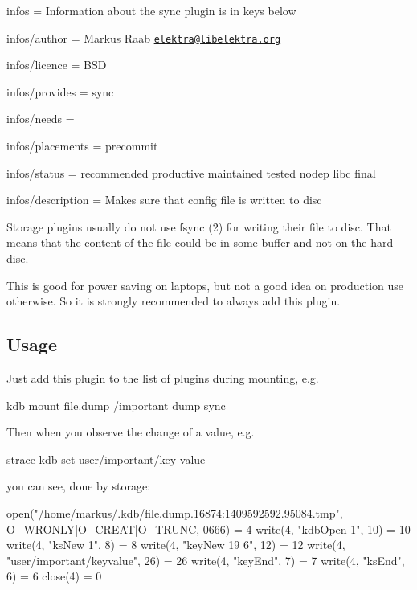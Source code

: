 
\begin{DoxyItemize}
\item infos = Information about the sync plugin is in keys below
\item infos/author = Markus Raab \href{mailto:elektra@libelektra.org}{\tt elektra@libelektra.\+org}
\item infos/licence = B\+SD
\item infos/provides = sync
\item infos/needs =
\item infos/placements = precommit
\item infos/status = recommended productive maintained tested nodep libc final
\item infos/description = Makes sure that config file is written to disc
\end{DoxyItemize}

Storage plugins usually do not use fsync (2) for writing their file to disc. That means that the content of the file could be in some buffer and not on the hard disc.

This is good for power saving on laptops, but not a good idea on production use otherwise. So it is strongly recommended to always add this plugin.

\subsection*{Usage}

Just add this plugin to the list of plugins during mounting, e.\+g. \begin{DoxyVerb}kdb mount file.dump /important dump sync
\end{DoxyVerb}


Then when you observe the change of a value, e.\+g. \begin{DoxyVerb}strace kdb set user/important/key value
\end{DoxyVerb}


you can see, done by storage\+: \begin{DoxyVerb}open("/home/markus/.kdb/file.dump.16874:1409592592.95084.tmp", 
        O_WRONLY|O_CREAT|O_TRUNC, 0666) = 4
write(4, "kdbOpen 1\n", 10)             = 10
write(4, "ksNew 1\n", 8)                = 8
write(4, "keyNew 19 6\n", 12)           = 12
write(4, "user/important/key\0value\0\n", 26) = 26
write(4, "keyEnd\n", 7)                 = 7
write(4, "ksEnd\n", 6)                  = 6
close(4)                                = 0
\end{DoxyVerb}


